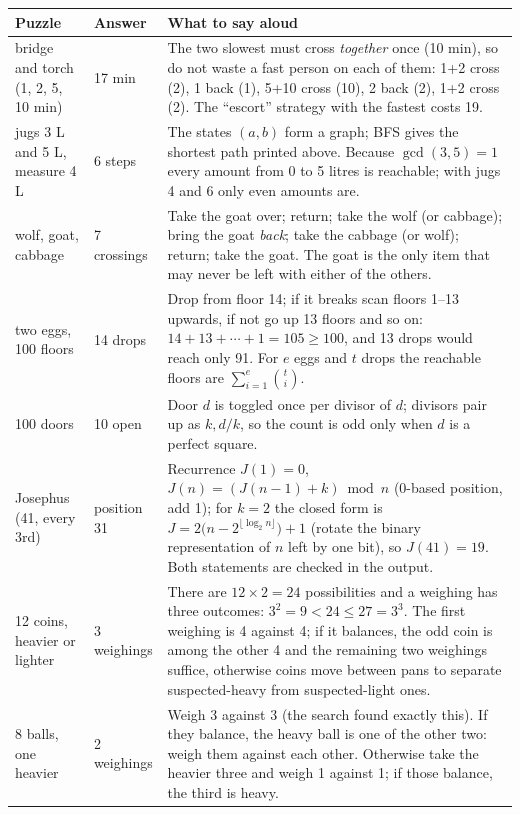 \documentclass[10pt,a4paper,openany,oneside]{report}
\begin{document}
\begin{center}\small
\begin{xltabular}{\textwidth}{@{}L{3.0cm}L{1.7cm}Y@{}}
\toprule
\textbf{Puzzle} & \textbf{Answer} & \textbf{What to say aloud}\\
\midrule\endhead
bridge and torch (1, 2, 5, 10 min) & 17 min & The two slowest must cross \emph{together} once (10 min), so do not waste a fast person on each of them: 1+2 cross (2), 1 back (1), 5+10 cross (10), 2 back (2), 1+2 cross (2). The ``escort'' strategy with the fastest costs 19.\\
jugs 3 L and 5 L, measure 4 L & 6 steps & The states $(a,b)$ form a graph; BFS gives the shortest path printed above. Because $\gcd(3,5)=1$ every amount from 0 to 5 litres is reachable; with jugs 4 and 6 only even amounts are.\\
wolf, goat, cabbage & 7 crossings & Take the goat over; return; take the wolf (or cabbage); bring the goat \emph{back}; take the cabbage (or wolf); return; take the goat. The goat is the only item that may never be left with either of the others.\\
two eggs, 100 floors & 14 drops & Drop from floor 14; if it breaks scan floors 1--13 upwards, if not go up 13 floors and so on: $14+13+\cdots+1=105\ge100$, and 13 drops would reach only 91. For $e$ eggs and $t$ drops the reachable floors are $\sum_{i=1}^{e}\binom ti$.\\
100 doors & 10 open & Door $d$ is toggled once per divisor of $d$; divisors pair up as $k,d/k$, so the count is odd only when $d$ is a perfect square.\\
Josephus (41, every 3rd) & position 31 & Recurrence $J(1)=0$, $J(n)=(J(n-1)+k)\bmod n$ (0-based position, add 1); for $k=2$ the closed form is $J=2\big(n-2^{\lfloor\log_2n\rfloor}\big)+1$ (rotate the binary representation of $n$ left by one bit), so $J(41)=19$. Both statements are checked in the output.\\
12 coins, heavier or lighter & 3 weighings & There are $12\times2=24$ possibilities and a weighing has three outcomes: $3^2=9<24\le27=3^3$. The first weighing is 4 against 4; if it balances, the odd coin is among the other 4 and the remaining two weighings suffice, otherwise coins move between pans to separate suspected-heavy from suspected-light ones.\\
8 balls, one heavier & 2 weighings & Weigh 3 against 3 (the search found exactly this). If they balance, the heavy ball is one of the other two: weigh them against each other. Otherwise take the heavier three and weigh 1 against 1; if those balance, the third is heavy.\\
\bottomrule
\end{xltabular}
\end{center}
\end{document}
